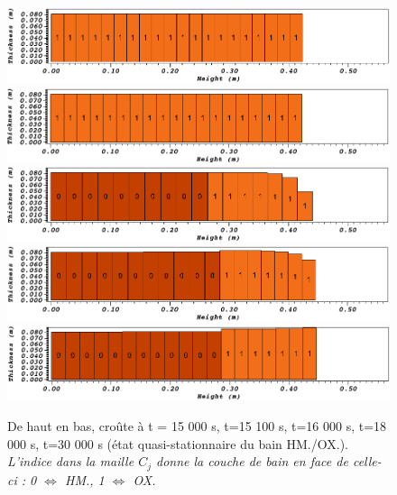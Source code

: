 \begin{figure}[H]
\centering
\includegraphics[width=\textwidth, keepaspectratio=true]{Figures/croute_15000.png}\\
\includegraphics[width=\textwidth, keepaspectratio=true]{Figures/croute_15100.png}\\
\includegraphics[width=\textwidth, keepaspectratio=true]{Figures/croute_16000.png}\\
\includegraphics[width=\textwidth, keepaspectratio=true]{Figures/croute_18000.png}\\
\includegraphics[width=\textwidth, keepaspectratio=true]{Figures/croute_30000.png}\\
\caption{De haut en bas, croûte à t = 15 000 s, t=15 100 s, t=16 000 s, t=18 000 s, t=30 000 s (état quasi-stationnaire du bain HM./OX.). \textit{L'indice dans la maille $C_j$ donne la couche de bain en face de celle-ci : 0 $\Leftrightarrow$ HM., 1 $\Leftrightarrow$ OX.}}
\label{fig:croutes_2}
\end{figure}

